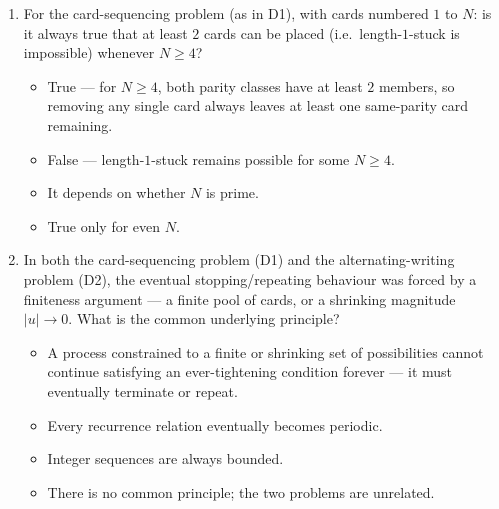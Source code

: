 \documentclass[11pt,a4paper]{article}
\begin{document}
\begin{enumerate}
\item For the card-sequencing problem (as in D1), with cards numbered $1$ to $N$: is it always true that at least $2$ cards can be placed (i.e.\ length-$1$-stuck is impossible) whenever $N\geq4$?
\begin{itemize}
\item[A)] True --- for $N\geq4$, both parity classes have at least $2$ members, so removing any single card always leaves at least one same-parity card remaining.
\item[B)] False --- length-$1$-stuck remains possible for some $N\geq4$.
\item[C)] It depends on whether $N$ is prime.
\item[D)] True only for even $N$.
\end{itemize}


\item In both the card-sequencing problem (D1) and the alternating-writing problem (D2), the eventual stopping/repeating behaviour was forced by a finiteness argument --- a finite pool of cards, or a shrinking magnitude $|u|\to0$. What is the common underlying principle?
\begin{itemize}
\item[A)] A process constrained to a finite or shrinking set of possibilities cannot continue satisfying an ever-tightening condition forever --- it must eventually terminate or repeat.
\item[B)] Every recurrence relation eventually becomes periodic.
\item[C)] Integer sequences are always bounded.
\item[D)] There is no common principle; the two problems are unrelated.
\end{itemize}


\end{enumerate}
\end{document}
